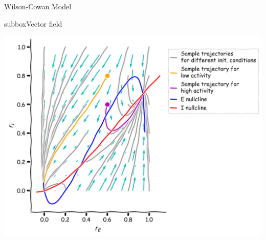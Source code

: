 \begin{textbox}{\href{https://compneuro.neuromatch.io/tutorials/W2D4_DynamicNetworks/chapter_title.html}{Wilson-Cowan Model } }
\begin{subbox}{subbox}{Vector field}
\begin{center}
\includegraphics[scale=0.15]{Figures/DN/DN_Figure10.png}
\end{center}

\end{subbox}
\end{textbox}